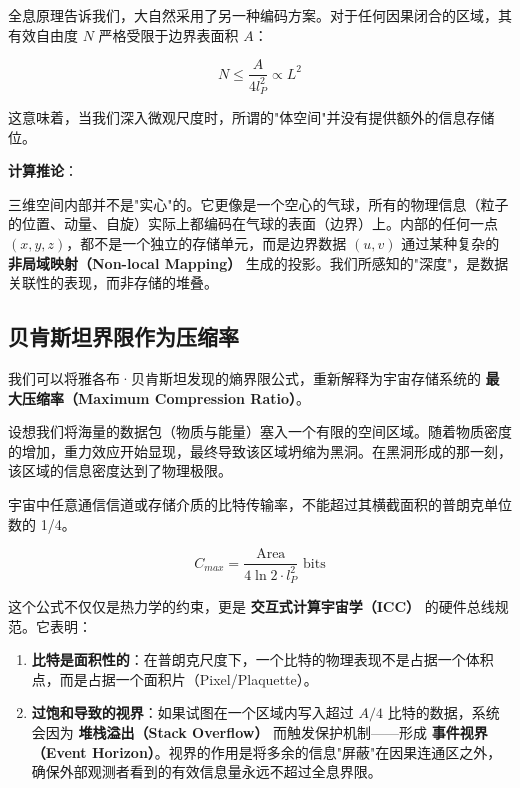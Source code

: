 全息原理告诉我们，大自然采用了另一种编码方案。对于任何因果闭合的区域，其有效自由度 $N$ 严格受限于边界表面积 $A$：

\begin{equation}
N \le \frac{A}{4l_P^2} \propto L^2
\end{equation}

这意味着，当我们深入微观尺度时，所谓的"体空间"并没有提供额外的信息存储位。

\textbf{计算推论}：

三维空间内部并不是"实心"的。它更像是一个空心的气球，所有的物理信息（粒子的位置、动量、自旋）实际上都编码在气球的表面（边界）上。内部的任何一点 $(x, y, z)$，都不是一个独立的存储单元，而是边界数据 $(u, v)$ 通过某种复杂的 \textbf{非局域映射（Non-local Mapping）} 生成的投影。我们所感知的"深度"，是数据关联性的表现，而非存储的堆叠。

\subsection{贝肯斯坦界限作为压缩率}

我们可以将雅各布·贝肯斯坦发现的熵界限公式，重新解释为宇宙存储系统的 \textbf{最大压缩率（Maximum Compression Ratio）}。

设想我们将海量的数据包（物质与能量）塞入一个有限的空间区域。随着物质密度的增加，重力效应开始显现，最终导致该区域坍缩为黑洞。在黑洞形成的那一刻，该区域的信息密度达到了物理极限。

\begin{theorem}[全息信道容量]
宇宙中任意通信信道或存储介质的比特传输率，不能超过其横截面积的普朗克单位数的 1/4。

\begin{equation}
C_{max} = \frac{\text{Area}}{4 \ln 2 \cdot l_P^2} \text{ bits}
\end{equation}
\end{theorem}

这个公式不仅仅是热力学的约束，更是 \textbf{交互式计算宇宙学（ICC）} 的硬件总线规范。它表明：

\begin{enumerate}
\item \textbf{比特是面积性的}：在普朗克尺度下，一个比特的物理表现不是占据一个体积点，而是占据一个面积片（Pixel/Plaquette）。

\item \textbf{过饱和导致的视界}：如果试图在一个区域内写入超过 $A/4$ 比特的数据，系统会因为 \textbf{堆栈溢出（Stack Overflow）} 而触发保护机制——形成 \textbf{事件视界（Event Horizon）}。视界的作用是将多余的信息"屏蔽"在因果连通区之外，确保外部观测者看到的有效信息量永远不超过全息界限。
\end{enumerate}

